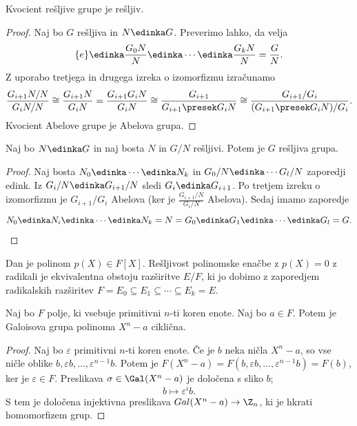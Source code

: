
\begin{trditev}
  Kvocient rešljive grupe je rešljiv.
\end{trditev}

\begin{proof}
  Naj bo $G$ rešljiva in $N \edinka G$.
  Preverimo lahko, da velja
  \[
	\{e\} \edinka \frac{G_0 N}{N} \edinka \cdots \edinka \frac{G_k N}{N} =
	\frac{G}{N}.
  \]
  Z uporabo tretjega in drugega izreka o izomorfizmu izračunamo
  \[
	\frac{G_{i+1} N / N}{G_i N / N} \cong \frac{G_{i+1} N}{G_i N}
	= \frac{G_{i+1} G_i N}{G_i N} \cong \frac{G_{i+1}}{G_{i+1} \presek G_i N}
	\cong \frac{G_{i+1} / G_i}{(G_{i+1} \presek G_i N) / G_i}.
  \]
  Kvocient Abelove grupe je Abelova grupa.
\end{proof}


\begin{trditev}
  Naj bo $N \edinka G$ in naj bosta $N$ in $G/N$ rešljivi.
  Potem je $G$ rešljiva grupa.
\end{trditev}

\begin{proof}
  Naj bosta $N_0 \edinka \cdots \edinka N_k$ in $G_0 / N \edinka \cdots G_l / N$
  zaporedji edink.
  Iz $G_i/N \edinka G_{i+1}/N$ sledi $G_i \edinka G_{i+1}$.
  Po tretjem izreku o izomorfizmu je $G_{i+1}/G_i$ Abelova (ker je
  $\frac{G_{i+1}/N}{G_i/N}$ Abelova).
  Sedaj imamo zaporedje
  \[
	N_0 \edinka N_i \edinka \cdots \edinka N_k = N = G_0 \edinka G_1 \edinka
	\cdots \edinka G_l = G.
  \]
\end{proof}



Dan je polinom $p(X) \in F[X]$.
Rešljivost polinomske enačbe z $p(X) = 0$ z radikali je ekvivalentna obstoju
razširitve $E/F$, ki jo dobimo z zaporedjem radikalskih razširitev $F = E_0
\subseteq E_1 \subseteq \cdots \subseteq E_k = E$.

\begin{lema}
  Naj bo $F$ polje, ki vsebuje primitivni $n$-ti koren enote.
  Naj bo $a \in F$.
  Potem je Galoisova grupa polinoma $X^n - a$ ciklična.
\end{lema}

\begin{proof}
  Naj bo $\varepsilon$ primitivni $n$-ti koren enote.
  Če je $b$ neka ničla $X^n - a$, so vse ničle oblike $b, \varepsilon b, \ldots,
  \varepsilon^{n-1} b$.
  Potem je $F(X^n - a) = F(b, \varepsilon b, \ldots, \varepsilon^{n-1} b) =
  F(b)$, ker je $\varepsilon \in F$.
  Preslikava $\sigma \in \Gal(X^n - a)$ je določena s sliko $b$;
  \[
	b \mapsto \varepsilon^i b.
  \]
  S tem je določena injektivna preslikava $Gal(X^n - a) \to \Z_n$, ki je
  hkrati homomorfizem grup.
\end{proof}

